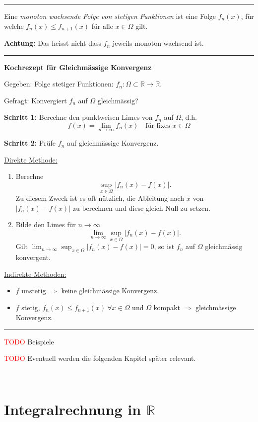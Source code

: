 \documentclass[a4paper,landscape,8pt]{extarticle}
\newcommand{\R}{\mathbb{R}}
\newcommand{\abs}[1]{\left\lvert #1 \right\rvert}
\newcommand{\todo}{\textcolor{red}{TODO }}
\newcommand{\sep}{\vspace{5pt}\noindent\hrule\vspace{5pt}}
\newcommand{\Achtung}{\textbf{Achtung: }}
\renewcommand*{\newpage}{ \ }
\begin{document}
\begin{multicols*}{4}
\sep

\Def Eine \emph{monoton wachsende Folge von stetigen Funktionen} ist eine Folge
$f_n(x)$, für welche $f_n(x)\leq f_{n+1}(x)$ für alle $x\in\Omega$ gilt.

\Achtung Das heisst nicht dass $f_n$ jeweils monoton wachsend ist.

\sep

\textbf{Kochrezept für Gleichmässige Konvergenz}

Gegeben: Folge stetiger Funktionen: $f_n\colon\Omega\subset\R\to\R$.

Gefragt: Konvergiert $f_n$ auf $\Omega$ gleichmässig?

\textbf{Schritt 1:} Berechne den punktweisen Limes von $f_n$ auf $\Omega$, d.h.
\[
f(x) = \lim_{n\to\infty} f_n(x) \quad \text{für fixes }x\in\Omega
\]

\textbf{Schritt 2:} Prüfe $f_n$ auf gleichmässige Konvergenz.

\underline{Direkte Methode:}
\begin{enumerate}[label=\roman*)]
  \item Berechne
  \[
  	\sup_{x\in\Omega} \abs{f_n(x)-f(x)}.
  \]
  Zu diesem Zweck ist es oft nützlich, die Ableitung nach $x$ von
  $\abs{f_n(x)-f(x)}$ zu berechnen und diese gleich Null zu setzen.
  \item Bilde den Limes für $n\to\infty$
  \[
  \lim_{n\to\infty} \sup_{x\in\Omega} \abs{f_n(x)-f(x)}.
  \]
  Gilt $\lim_{n\to\infty} \sup_{x\in\Omega} \abs{f_n(x)-f(x)}=0$, so ist $f_n$
  auf $\Omega$ gleichmässig konvergent.
\end{enumerate}

\underline{Indirekte Methoden:}
\begin{itemize}
  \item $f$ unstetig $\Longrightarrow$ keine gleichmässige Konvergenz.
  \item $f$ stetig, $f_n(x)\leq f_{n+1}(x) \ \forall x\in\Omega$ und $\Omega$
  kompakt $\Longrightarrow$ gleichmässige Konvergenz.
\end{itemize}

\begin{warmup}
\sep

\todo Beispiele

\todo Eventuell werden die folgenden Kapitel später relevant.
\end{warmup}


\newpage

\part{Integralrechnung in $\R$}


\end{multicols*}
\end{document}
